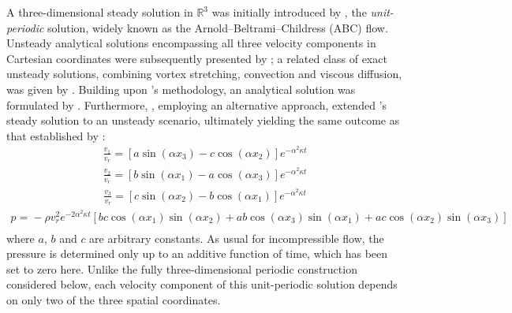 \documentclass[11pt]{jfm}
\numberwithin{equation}{section}
\begin{document}
A three-dimensional steady solution in $\mathbb{R}^3$ was initially introduced by \cite{arn}, the \emph{unit-periodic} solution, widely known as the Arnold--Beltrami--Childress (ABC) flow. Unsteady analytical solutions encompassing all three velocity components in Cartesian coordinates were subsequently presented by \cite{eth}; a related class of exact unsteady solutions, combining vortex stretching, convection and viscous diffusion, was given by \cite{kam}. Building upon \cite{eth}'s methodology, an analytical solution was formulated by \cite{bab}. Furthermore, \cite{tha1}, employing an alternative approach, extended \cite{arn}'s steady solution to an unsteady scenario, ultimately yielding the same outcome as that established by \cite{bab}:
\begin{eqnarray}
\label{1.10}
\frac{v_1}{v_r} = \left[ {a\sin \left( {\alpha x_3 } \right) - c\cos \left( {\alpha x_2 } \right)}\right]e^{ - \alpha ^2 \kappa t}
\end{eqnarray}
\begin{eqnarray}
\label{1.11}
\frac{v_2}{v_r}   = \left[ b\sin \left( {\alpha x_1 } \right)- {a\cos \left( {\alpha x_3 } \right)}\right]e^{ - \alpha ^2 \kappa t}
\end{eqnarray}
\begin{eqnarray}
\label{1.12}
\frac{v_3}{v_r}   = \left[ {c\sin \left( {\alpha x_2 } \right) - b\cos \left( {\alpha x_1 } \right)}\right]e^{ - \alpha ^2 \kappa t}
\end{eqnarray}
\begin{eqnarray}
\label{1.13}
p \!= \! - \rho v_r^2 e^{ - 2\alpha ^2 \kappa t}\! \left[ {bc\cos \left( {\alpha x_1 } \right)\sin \left( {\alpha x_2 } \right) + ab\cos \left( {\alpha x_3 } \right)\sin \left( {\alpha x_1 } \right) + ac\cos \left( {\alpha x_2 } \right)\sin \left( {\alpha x_3 } \right)} \right]\nonumber\\
\end{eqnarray}
where $a$, $b$ and $c$ are arbitrary constants. As usual for incompressible flow, the pressure is
determined only up to an additive function of time, which has been set to zero here. Unlike the fully three-dimensional periodic
construction considered below, each velocity component of this unit-periodic solution depends on
only two of the three spatial coordinates.
\end{document}
